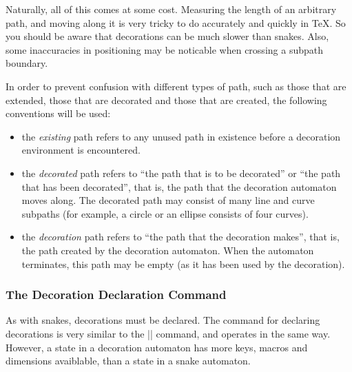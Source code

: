 Naturally, all of this comes at some cost. Measuring the 
length of an arbitrary path, and moving along it is very tricky 
to do accurately and quickly in \TeX. So you should be aware that 
decorations can be much slower than snakes. Also, some inaccuracies
in positioning may be noticable when crossing a subpath boundary.

In order to prevent confusion with different types of path, such
as those that are extended, those that are decorated and those that 
are created, the following conventions will be used:

\begin{itemize}
	\item 
		the \emph{existing} path refers to any unused path in existence 
		before a decoration environment is encountered.
	\item
		the \emph{decorated} path refers to ``the path that is to be 
		decorated''	or ``the path that has been decorated'', that is, 
		the path that	the decoration automaton moves along. The decorated
		path may consist of many line and curve subpaths (for example,
		a circle or an ellipse consists of four curves).
	\item
		the \emph{decoration} path refers to ``the path that the decoration 
		makes'', that is, the path created by the decoration automaton.
		When the automaton terminates, this path may be empty (as it has
		been used by the decoration).
\end{itemize}

\subsubsection{The Decoration Declaration Command}

As with snakes, decorations must be declared. The command for
declaring decorations is very similar to the |\pgfdeclaresnake| 
command, and operates in the same way. However, a state in a
decoration automaton has more keys, macros and dimensions
avaiblable, than a state in a snake automaton.

